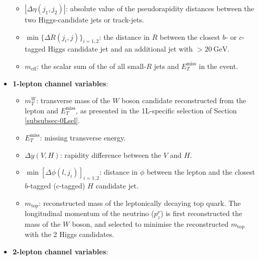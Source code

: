 \begin{itemize}
    \begin{itemize}
        \item $|\Delta \eta (j_1,j_2)|$: absolute value of the pseudorapidity distances between the two Higgs-candidate jets or track-jets.
        \item $\min\{\Delta R(j_i, j)\}_{i=1,2}$: the distance in $R$ between the closest $b$- or $c$-tagged Higgs candidate jet and an additional jet with \ptv$>20~\text{GeV}$.
        \item $m_{\textrm{eff}}$: the scalar sum of the \pt of all small-$R$ jets and $E_T^{\textrm{miss}}$ in the event.
    \end{itemize}
    \item \textbf{1-lepton channel variables}:  
    \begin{itemize}
        \item $m_T^W$: transverse mass of the $W$ boson candidate reconstructed from the lepton and $E_T^{\textrm{miss}}$, as presented in the 1L-specific selection of Section \ref{subsubsec-0Lsel}.
        \item $E_T^{\textrm{miss}}$: missing transverse energy. 
        \item $\Delta y(\textbf{$V$},\textbf{$H$})$: rapidity difference between the $V$ and $H$.
        \item $\min\left[\Delta\phi(\textbf{$l$},\textbf{$j_i$})\right]_{i=1,2}$: distance in $\phi$ between the lepton and the closest $b$-tagged ($c$-tagged) $H$ candidate jet. 
        \item $m_{\text{top}}$: reconstructed mass of the leptonically decaying top quark. The longitudinal momentum of the neutrino ($p_{z}^{\nu}$) is first reconstructed the mass of the $W$ boson, and selected to minimise the reconstructed $m_{\text{top}}$ with the 2 Higgs candidates.
    \end{itemize}
    \item \textbf{2-lepton channel variables}: 
\end{itemize}

